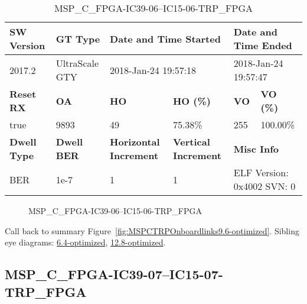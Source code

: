 \begin{table}[h]
\centering
\caption{MSP\_C\_FPGA-IC39-06--IC15-06-TRP\_FPGA}
\label{tab:MSPCFPGAIC3906IC1506TRPFPGA9.6-optimized}
\begin{tabular}{@{}|l|l|l|l|l|l|@{}}
\toprule
\textbf{SW Version}                & \textbf{GT Type}   & \multicolumn{2}{l|}{\textbf{Date and Time Started}}            & \multicolumn{2}{l|}{\textbf{Date and Time Ended}}        \\ \midrule
2017.2                       & UltraScale GTY          & \multicolumn{2}{l|}{2018-Jan-24 19:57:18}                   & \multicolumn{2}{l|}{2018-Jan-24 19:57:47}               \\ \midrule
\textbf{Reset RX}                  & \textbf{OA} & \textbf{HO}   & \textbf{HO (\%)} & \textbf{VO} & \textbf{VO (\%)} \\ \midrule
true & 9893        & 49          & 75.38\%        & 255        & 100.00\%       \\ \midrule
\textbf{Dwell Type}                & \textbf{Dwell BER} & \textbf{Horizontal Increment} & \textbf{Vertical Increment}    & \multicolumn{2}{l|}{\textbf{Misc Info}}                  \\ \midrule
BER                            & 1e-7        & 1        & 1           & \multicolumn{2}{l|}{ELF Version: 0x4002 SVN: 0}                         \\ \bottomrule
\end{tabular}
\end{table}

\begin{figure}[h]
\caption{MSP\_C\_FPGA-IC39-06--IC15-06-TRP\_FPGA} \label{fig:MSPCFPGAIC3906IC1506TRPFPGA9.6-optimized}
\end{figure}

Call back to summary Figure~\ref{fig:MSPCTRPOnboardlinks9.6-optimized}.
Sibling eye diagrams: \hyperref[sec:MSPCFPGAIC3906IC1506TRPFPGA6.4-optimized]{6.4-optimized}, \hyperref[sec:MSPCFPGAIC3906IC1506TRPFPGA12.8-optimized]{12.8-optimized}.

\clearpage
\newpage


\subsection{MSP\_C\_FPGA-IC39-07--IC15-07-TRP\_FPGA}\label{sec:MSPCFPGAIC3907IC1507TRPFPGA9.6-optimized}

